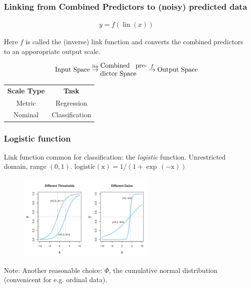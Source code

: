 \documentclass[usenames,dvipsnames,table]{beamer}
\begin{document}
\begin{frame}
\frametitle{Linking from Combined Predictors to (noisy) predicted data}

\begin{align*}
y = f(\operatorname{lin}(x)) \tag{15.11}
\end{align*}

Here $f$ is called the (inverse) link function and converts the combined predictors to an apporopriate output scale.

\begin{align*}
\textrm{Input Space} \overset{\operatorname{lin}}{\rightarrow} \parbox{7em}{\textrm{Combined predictor Space}} \overset{f}{\rightarrow} \textrm{Output Space}
\end{align*}

\begin{table}
\centering
\begin{tabular}{cc}
\textbf{Scale Type} & \textbf{Task} \\
Metric     & Regression \\
Nominal    & Classification
\end{tabular}
\end{table}
\end{frame}


\begin{frame}
\frametitle{Logistic function}
Link function common for classification: the \emph{logistic} function. Unrestricted domain, range $(0, 1)$. $\operatorname{logistic(x) = 1/ (1+\exp\,(-x))}$
\begin{figure}
\centering
\includegraphics[width=0.6\textwidth]{img/fig15_6}
\end{figure}

Note: Another reasonable choice: $\Phi$, the cumulative normal distribution (convenicent for e.g. ordinal data).
\end{frame}
\end{document}
